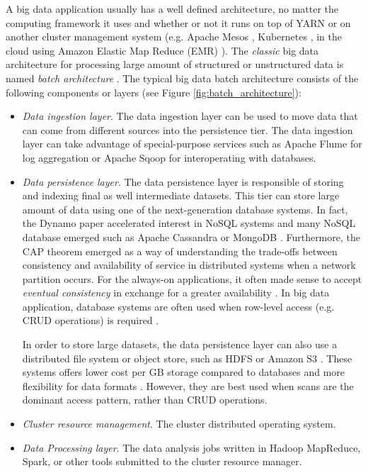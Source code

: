 A big data application usually has a well defined architecture, no matter the computing framework it uses and whether or not it runs on top of YARN or on another cluster management system (e.g. Apache Mesos  \cite{apachemesosonline}, Kubernetes \cite{kubernetesonline}, in the cloud using Amazon Elastic Map Reduce (EMR) \cite{amazonemronline}). The \emph{classic} big data architecture for processing large amount of structured or unstructured data is named \emph{batch architecture} \cite{philosophydistributeddata, fastdataarchitecture, streamingbigdataprocessinginclouds}. The typical big data batch architecture consists of the following components or layers (see Figure \ref{fig:batch_architecture}):
\begin{itemize}
\item	 \emph{Data ingestion layer}. The data ingestion layer can be used to move data that can come from different sources into the persistence tier. The data ingestion layer can take advantage of special-purpose services such as Apache Flume \cite{apacheflumeonline} for log aggregation or Apache Sqoop \cite{apachesqooponline} for interoperating with databases.
\item \emph{Data persistence layer}. The data persistence layer is responsible of storing and indexing final as well intermediate datasets. This tier can store large amount of data using one of the next-generation database systems. In fact, the Dynamo \cite{dynamo} paper accelerated interest in NoSQL systems and many NoSQL database emerged such as Apache Cassandra \cite{apachecassandraonline} or MongoDB \cite{mongodbonline}. Furthermore, the CAP theorem emerged as a way of understanding the trade-offs between consistency and availability of service in distributed systems when a network partition occurs. For the always-on applications, it often made sense to accept \emph{eventual consistency} in exchange for a greater availability \cite{fastdataarchitecture}. In big data application, database systems are often used when row-level access (e.g. CRUD operations) is required \cite{fastdataarchitecture}.

In order to store large datasets, the data persistence layer can also use a distributed file system or object store, such as HDFS or Amazon S3 \cite{awss3online}. These systems offers lower cost per GB storage compared to databases and more flexibility for data formats \cite{fastdataarchitecture}. However, they are best used when scans are the dominant access pattern, rather than CRUD operations. 
\item  \emph{Cluster resource management}. The cluster distributed operating system.
\item  \emph{Data Processing layer}. The data analysis jobs written in Hadoop MapReduce, Spark, or other tools submitted to the cluster resource manager.
\end{itemize}

